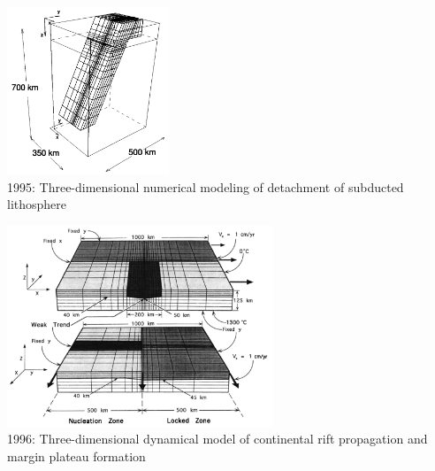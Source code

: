 \begin{center}
\includegraphics[height=5cm]{images/history/yowo95}\\
{\small 1995: Three-dimensional numerical modeling of detachment of subducted 
lithosphere \cite{yowo95}}
\end{center}

\begin{center}
\includegraphics[height=6cm]{images/history/dusa96}\\
{\small 1996: Three-dimensional dynamical model of continental rift propagation and 
margin plateau formation \cite{dusa96}}
\end{center}

